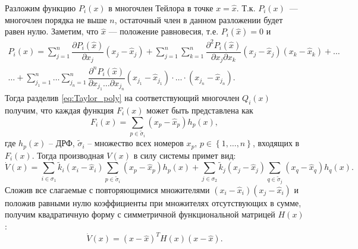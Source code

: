 \documentclass[14pt,a4paper]{extarticle}
\begin{document}
	Разложим функцию $P_i(x)$ в многочлен Тейлора в точке $x=\hat{x}$. Т.к. $P_i(x)$~--- многочлен порядка не выше $n$, остаточный член в данном разложении будет равен нулю. Заметим, что $\hat{x}$ --- положение равновесия, т.е. $P_i(\hat{x})=0$ и
	\begin{multline}\label{eq:Taylor_poly}
	P_i(x) = \sum\limits_{j=1}^n\dfrac{\partial{P}_i(\hat{x})}{\partial{x}_j}(x_j-\hat{x}_j) + \sum\limits_{j=1}^n\sum\limits_{k=1}^n\dfrac{\partial^2{P}_i(\hat{x})}{\partial{x}_j\partial{x}_k}(x_j-\hat{x}_j)(x_k-\hat{x}_k)+\ldots\\
	\ldots + \sum\limits_{j_1=1}^n\ldots\sum\limits_{j_n=1}^n\dfrac{\partial^n{P}_i(\hat{x})}{\partial{x}_{j_1}\ldots\partial{x}_{j_n}}(x_{j_1}-\hat{x}_{j_1})\cdot\ldots\cdot(x_{j_n}-\hat{x}_{j_n}).
	\end{multline}
	Тогда разделив \ref{eq:Taylor_poly} на соответствующий многочлен $Q_i(x)$ получим, что каждая функция $F_i(x)$ может быть представлена как
	\[F_i(x)=\sum\limits_{p\in\tilde{\sigma}_i}(x_p-\hat{x}_p)h_p(x),\]    
	где $h_p(x)$ -- ДРФ, $\tilde{\sigma}_i$ -- множество всех номеров $x_p,\, p\in\left\{1,\ldots,n\right\}$, входящих в $F_i(x)$. Тогда производная $V(x)$ в силу системы примет вид:
	\[\dot{V}(x)=\sum\limits_{i\in\sigma_1}\tilde{k}_i(x_i-\hat{x}_i)\sum\limits_{p\in\tilde{\sigma}_i}(x_p-\hat{x}_p)h_{p}(x)+\sum\limits_{j\in\sigma_2}\tilde{k}_j(x_j-\hat{x}_j)\sum\limits_{q\in\tilde{\sigma}_j}(x_q-\hat{x}_q)h_{q}(x).\]
	Сложив все слагаемые с повторяющимися множителями $(x_i-\hat{x}_i)(x_j-\hat{x}_i)$ и положив равными нулю коэффициенты при множителях отсутствующих в сумме, получим квадратичную форму с симметричной функциональной матрицей $H(x)$:
	\[\dot{V}(x)=(x-\hat{x})^{T}H(x)(x-\hat{x}).\]
\end{document}
